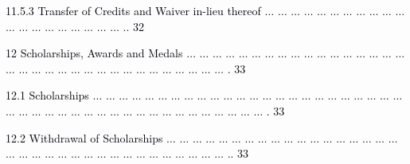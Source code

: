 \documentclass[12pt]{article}
\begin{document}
\vspace{\baselineskip}
\begin{adjustwidth}{0.5in}{0.0in}
{\fontsize{7pt}{8.4pt}\selectfont \textcolor[HTML]{00000A}{11.5.3 Transfer of Credits and Waiver in-lieu thereof $ \ldots $ $ \ldots $ $ \ldots $ $ \ldots $ $ \ldots $ $ \ldots $ $ \ldots $ $ \ldots $ $ \ldots $ $ \ldots $ $ \ldots $ $ \ldots $ $ \ldots $ $ \ldots $ $ \ldots $ $ \ldots $ $ \ldots $ $ \ldots $ $ \ldots $ $ \ldots $ .. 32}\par}\par

\end{adjustwidth}


\vspace{\baselineskip}
{\fontsize{7pt}{8.4pt}\selectfont \textcolor[HTML]{00000A}{12 Scholarships, Awards and Medals $ \ldots $ $ \ldots $ $ \ldots $ $ \ldots $ $ \ldots $ $ \ldots $ $ \ldots $ $ \ldots $ $ \ldots $ $ \ldots $ $ \ldots $ $ \ldots $ $ \ldots $ $ \ldots $ $ \ldots $ $ \ldots $ $ \ldots $ $ \ldots $ $ \ldots $ $ \ldots $ $ \ldots $ $ \ldots $ $ \ldots $ $ \ldots $ $ \ldots $ $ \ldots $ $ \ldots $ $ \ldots $ $ \ldots $ $ \ldots $ $ \ldots $ $ \ldots $ $ \ldots $ $ \ldots $ . 33}\par}\par


\vspace{\baselineskip}
\begin{adjustwidth}{0.21in}{0.0in}
{\fontsize{7pt}{8.4pt}\selectfont \textcolor[HTML]{00000A}{12.1 Scholarships $ \ldots $ $ \ldots $ $ \ldots $ $ \ldots $ $ \ldots $ $ \ldots $ $ \ldots $ $ \ldots $ $ \ldots $ $ \ldots $ $ \ldots $ $ \ldots $ $ \ldots $ $ \ldots $ $ \ldots $ $ \ldots $ $ \ldots $ $ \ldots $ $ \ldots $ $ \ldots $ $ \ldots $ $ \ldots $ $ \ldots $ $ \ldots $ $ \ldots $ $ \ldots $ $ \ldots $ $ \ldots $ $ \ldots $ $ \ldots $ $ \ldots $ $ \ldots $ $ \ldots $ $ \ldots $ $ \ldots $ $ \ldots $ $ \ldots $ $ \ldots $ $ \ldots $ $ \ldots $ $ \ldots $ $ \ldots $ $ \ldots $ $ \ldots $ . 33}\par}\par

\end{adjustwidth}


\vspace{\baselineskip}
\begin{adjustwidth}{0.21in}{0.0in}
{\fontsize{7pt}{8.4pt}\selectfont \textcolor[HTML]{00000A}{12.2 Withdrawal of Scholarships $ \ldots $ $ \ldots $ $ \ldots $ $ \ldots $ $ \ldots $ $ \ldots $ $ \ldots $ $ \ldots $ $ \ldots $ $ \ldots $ $ \ldots $ $ \ldots $ $ \ldots $ $ \ldots $ $ \ldots $ $ \ldots $ $ \ldots $ $ \ldots $ $ \ldots $ $ \ldots $ $ \ldots $ $ \ldots $ $ \ldots $ $ \ldots $ $ \ldots $ $ \ldots $ $ \ldots $ $ \ldots $ $ \ldots $ $ \ldots $ $ \ldots $ $ \ldots $ $ \ldots $ $ \ldots $ $ \ldots $ .. 33}\par}\par

\end{adjustwidth}
\end{document}
